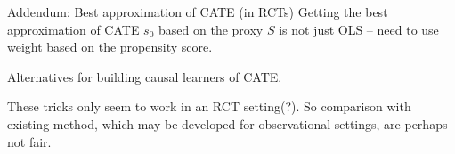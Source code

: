 \documentclass[smaller, aspectratio=169]{beamer}
\newcommand{\1}{\mathds{1}}
\begin{document}
\begin{frame}[label={sec:org6f2e7d1}]{Addendum: Best approximation of CATE (in RCTs)}
Getting the best approximation of CATE \(s_0\) based on the proxy \(S\) is not just OLS -- need to use weight based on the propensity
score.

\vfill

Alternatives for building causal learners of CATE.

\vfill

These tricks only seem to work in an RCT setting(?). So comparison
with existing method, which may be developed for observational
settings, are perhaps not fair. 
\end{frame}
\end{document}

